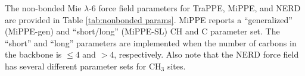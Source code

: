 \documentclass[journal=jced,manuscript=article]{achemso}
\begin{document}
    The non-bonded Mie $\lambda$-6 force field parameters for TraPPE, MiPPE, and NERD are provided in Table \ref{tab:nonbonded params}. MiPPE reports a ``generalized'' (MiPPE-gen) and ``short/long'' (MiPPE-SL) CH and C parameter set. The ``short'' and ``long'' parameters are implemented when the number of carbons in the backbone is $\le 4$ and $> 4$, respectively. Also note that the NERD force field has several different parameter sets for CH$_3$ sites.
    
\end{document}
